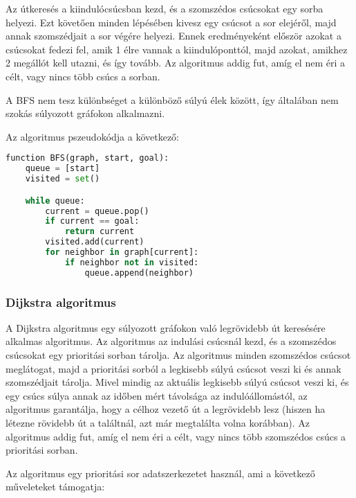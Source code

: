 Az útkeresés a kiindulócsúcsban kezd, és a szomszédos csúcsokat egy sorba helyezi. Ezt követően minden lépésében kivesz egy csúcsot a sor elejéről, majd annak szomszédjait a sor végére helyezi. Ennek eredményeként először azokat a csúcsokat fedezi fel, amik 1 élre vannak a kiindulóponttól, majd azokat, amikhez 2 megállót kell utazni, és így tovább\cite{russell2020artificial}. Az algoritmus addig fut, amíg el nem éri a célt, vagy nincs több csúcs a sorban.

A BFS nem tesz különbséget a különböző súlyú élek között, így általában nem szokás súlyozott gráfokon alkalmazni\cite{russell2020artificial}.

Az algoritmus pszeudokódja a következő: \\

\begin{minipage}{\textwidth}
\begin{lstlisting}[language={Python}]
function BFS(graph, start, goal):
    queue = [start]
    visited = set()

    while queue:
        current = queue.pop()
        if current == goal:
            return current
        visited.add(current)
        for neighbor in graph[current]:
            if neighbor not in visited:
                queue.append(neighbor)
\end{lstlisting}
\end{minipage}

\subsubsection{Dijkstra algoritmus}

A Dijkstra algoritmus egy súlyozott gráfokon való legrövidebb út\cite{russell2020artificial} keresésére alkalmas algoritmus. Az algoritmus az indulási csúcsnál kezd, és a szomszédos csúcsokat egy prioritási sorban tárolja. Az algoritmus minden szomszédos csúcsot meglátogat, majd a prioritási sorból a legkisebb súlyú csúcsot veszi ki és annak szomszédjait tárolja. Mivel mindig az aktuális legkisebb súlyú csúcsot veszi ki, és egy csúcs súlya annak az időben mért távolsága az indulóállomástól, az algoritmus garantálja, hogy a célhoz vezető út a legrövidebb lesz (hiszen ha létezne rövidebb út a találtnál, azt már megtalálta volna korábban). Az algoritmus addig fut, amíg el nem éri a célt, vagy nincs több szomszédos csúcs a prioritási sorban.

Az algoritmus egy prioritási sor adatszerkezetet használ, ami a következő műveleteket támogatja:

